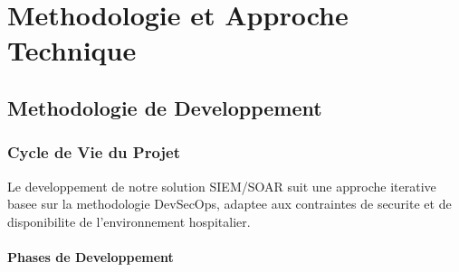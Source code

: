 \chapter{Methodologie et Approche Technique}

\section{Methodologie de Developpement}

\subsection{Cycle de Vie du Projet}

Le developpement de notre solution SIEM/SOAR suit une approche iterative basee sur la methodologie DevSecOps, adaptee aux contraintes de securite et de disponibilite de l'environnement hospitalier.

\subsubsection{Phases de Developpement}

